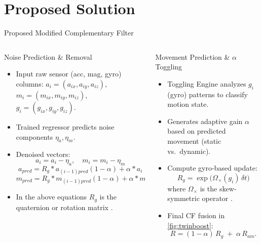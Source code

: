 \documentclass[aspectratio=169,xcolor=dvipsnames]{beamer}
\begin{document}
\section{Proposed Solution}

\begin{frame}{Proposed Modified Complementary Filter}
\scriptsize
\begin{columns}[T]
  \begin{column}{0.48\textwidth}
    \begin{block}{{Noise Prediction \& Removal} \cite{brossard2020openloopCNN}}
      \begin{itemize}
        \item Input raw sensor (acc, mag, gyro) columns: 
          $a_i=(a_{ix},a_{iy},a_{iz})$, 
          $m_i=(m_{ix},m_{iy},m_{iz})$, 
          $g_i=(g_{ix},g_{iy},g_{iz})$.
        \item Trained regressor predicts noise components $\eta_a,\eta_m$.
        \item Denoised vectors:
          \[
            a_i = a_i - \eta_a,\quad
            m_i = m_i - \eta_m 
          \]
          \[
            a_{\textit{pred}} = R_g*a_{(i-1)pred}(1-\alpha) + \alpha*a_i
          \]
          \[
            m_{\textit{pred}} = R_g*m_{(i-1)pred}(1-\alpha) + \alpha*m_i
          \]
        \item In the above equations $R_{g}$ is the quaternion or rotation matrix \cite{black1964passive}\cite{cariow2016hardware}.
      \end{itemize}
    \end{block}
  \end{column}
  \begin{column}{0.48\textwidth}
    \begin{block}{{Movement Prediction \& $\alpha$ Toggling} \cite{vertzberger2022adaptive}}
      \begin{itemize}
        \item Toggling Engine analyzes $g_i$ (gyro) patterns to classify motion state.
        \item Generates adaptive gain $\alpha$ based on predicted movement (static vs.\ dynamic).
        \item Compute gyro‐based update:
        \[
          R_g = \exp\bigl(\Omega_{\times}(g_i)\,\delta t\bigr)
        \]
        where $\Omega_{\times}$ is the skew‐symmetric operator \cite{zhao2016time}.
        \item Final CF fusion in \autoref{fig:twinboost}:
        \[
          R = (1-\alpha)\,R_g \;+\;\alpha\,R_{am}.
        \]
      \end{itemize}
    \end{block}
  \end{column}
\end{columns}
\end{frame}
\end{document}
